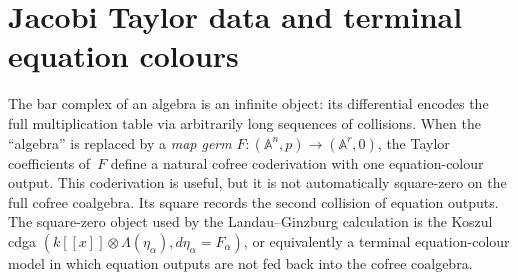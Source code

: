 
\section{Jacobi Taylor data and terminal equation colours}\label{sec:jacobi-coalgebra}

The bar complex of an algebra is an infinite object: its differential
encodes the full multiplication table via arbitrarily long sequences
of collisions. When the ``algebra'' is replaced by a \emph{map germ}
$F\colon (\mathbb{A}^n, p) \to (\mathbb{A}^r, 0)$, the Taylor
coefficients of~$F$ define a natural cofree coderivation with one
equation-colour output. This coderivation is useful, but it is not
automatically square-zero on the full cofree coalgebra. Its square
records the second collision of equation outputs. The square-zero
object used by the Landau--Ginzburg calculation is the Koszul cdga
\((k[[x]]\otimes\Lambda(\eta_\alpha),d\eta_\alpha=F_\alpha)\), or
equivalently a terminal equation-colour model in which equation
outputs are not fed back into the cofree coalgebra.

